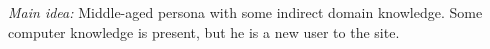 \textit{Main idea:}
Middle-aged persona with some indirect domain knowledge. Some computer knowledge is present, but he is a new user to the site.


